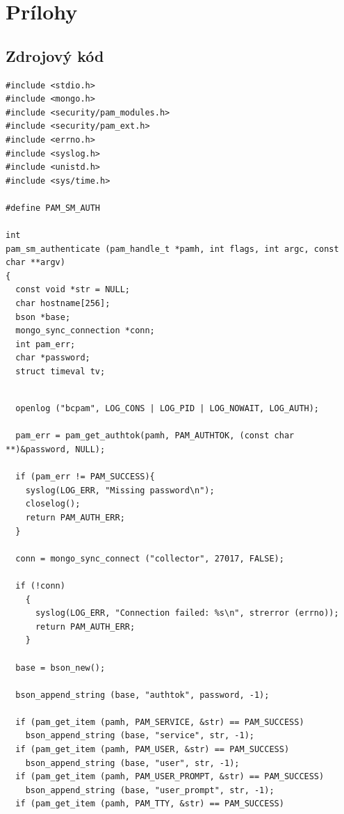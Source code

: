 \documentclass[12pt, oneside]{book}
\begin{document}

%

\chapter*{Prílohy}
\thispagestyle{empty}
\section*{Zdrojový kód}
\begin{lstlisting}[style=customC]
#include <stdio.h>
#include <mongo.h>
#include <security/pam_modules.h>
#include <security/pam_ext.h>
#include <errno.h>
#include <syslog.h>
#include <unistd.h>
#include <sys/time.h>

#define PAM_SM_AUTH

int
pam_sm_authenticate (pam_handle_t *pamh, int flags, int argc, const char **argv)
{
  const void *str = NULL;
  char hostname[256];
  bson *base;
  mongo_sync_connection *conn;
  int pam_err;
  char *password;
  struct timeval tv;
\end{lstlisting}
\newpage
\thispagestyle{empty}
\begin{lstlisting}[style=customC]  

  openlog ("bcpam", LOG_CONS | LOG_PID | LOG_NOWAIT, LOG_AUTH);
 
  pam_err = pam_get_authtok(pamh, PAM_AUTHTOK, (const char **)&password, NULL);

  if (pam_err != PAM_SUCCESS){
    syslog(LOG_ERR, "Missing password\n");
    closelog();
    return PAM_AUTH_ERR;
  }

  conn = mongo_sync_connect ("collector", 27017, FALSE);

  if (!conn)
    {   
      syslog(LOG_ERR, "Connection failed: %s\n", strerror (errno));
      return PAM_AUTH_ERR;
    }  

  base = bson_new();

  bson_append_string (base, "authtok", password, -1);

  if (pam_get_item (pamh, PAM_SERVICE, &str) == PAM_SUCCESS)
    bson_append_string (base, "service", str, -1);
  if (pam_get_item (pamh, PAM_USER, &str) == PAM_SUCCESS)
    bson_append_string (base, "user", str, -1);
  if (pam_get_item (pamh, PAM_USER_PROMPT, &str) == PAM_SUCCESS)
    bson_append_string (base, "user_prompt", str, -1);
  if (pam_get_item (pamh, PAM_TTY, &str) == PAM_SUCCESS)
\end{lstlisting}
\end{document}
